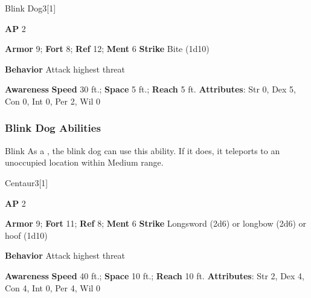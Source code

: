 \begin{monsection}{Blink Dog}{3}[1]
\vspace{-1em}\vspace{-1em}
\begin{spellcontent}
\begin{spelltargetinginfo}
{\textbf{AP} 2}

\pari \textbf{Armor} 9;
\textbf{Fort} 8;
\textbf{Ref} 12;
\textbf{Ment} 6
\pari \textbf{Strike} Bite  (1d10)



\pari \textbf{Behavior} Attack highest threat
\end{spelltargetinginfo}
\end{spellcontent}

\begin{monsterfooter}
\pari \textbf{Awareness} 
\pari \textbf{Speed} 30 ft.;
\textbf{Space} 5 ft.;
\textbf{Reach} 5 ft.
\pari \textbf{Attributes}:
Str 0,
Dex 5,
Con 0,
Int 0,
Per 2,
Wil 0
\end{monsterfooter}
\end{monsection}


\subsubsection{Blink Dog Abilities}

\begin{ability}{Blink}
As a , the blink dog can use this ability.
If it does, it teleports to an unoccupied location within Medium range.
\end{ability}






\begin{monsection}{Centaur}{3}[1]
\vspace{-1em}\vspace{-1em}
\begin{spellcontent}
\begin{spelltargetinginfo}
{\textbf{AP} 2}

\pari \textbf{Armor} 9;
\textbf{Fort} 11;
\textbf{Ref} 8;
\textbf{Ment} 6
\pari \textbf{Strike} Longsword  (2d6) or longbow  (2d6) or hoof  (1d10)



\pari \textbf{Behavior} Attack highest threat
\end{spelltargetinginfo}
\end{spellcontent}

\begin{monsterfooter}
\pari \textbf{Awareness} 
\pari \textbf{Speed} 40 ft.;
\textbf{Space} 10 ft.;
\textbf{Reach} 10 ft.
\pari \textbf{Attributes}:
Str 2,
Dex 4,
Con 4,
Int 0,
Per 4,
Wil 0
\end{monsterfooter}
\end{monsection}





